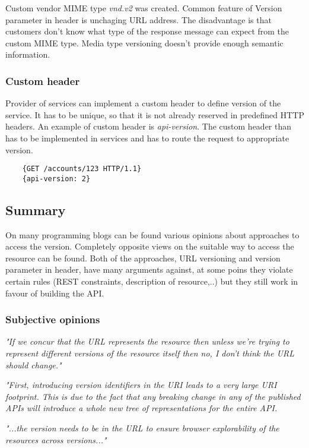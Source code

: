 Custom vendor MIME type \emph{vnd.v2} was created. Common feature of Version parameter in header is unchaging URL address. The disadvantage is that customers don't know what type of the response message can expect from the custom MIME type. Media type versioning doesn't provide enough semantic information.


\subsubsection{Custom header}
Provider of services can implement a custom header to define version of the service. It has to be unique, so that it is not already reserved in predefined HTTP headers. An example of custom header is \emph{api-version}. The custom header than has to be implemented in services and has to route the request to appropriate version.

\begin{lstlisting}
    {GET /accounts/123 HTTP/1.1}
    {api-version: 2}
\end{lstlisting}


\subsection{Summary}
On many programming blogs can be found various opinions about approaches to access the version. Completely opposite views on the suitable way to access the resource can be found. Both of the approaches, URL versioning and version parameter in header, have many arguments against, at some poins they violate certain rules (REST constraints, description of resource,..) but they still work in favour of building the API.

\subsubsection{Subjective opinions}
\emph{"If we concur that the URL represents the resource then unless we’re trying to represent different versions of the resource itself then no, I don’t think the URL should change."\cite{website:wrong-ways}}
\bigskip

\emph{"First, introducing version identifiers in the URI leads to a very large URI footprint. This is due to the fact that any breaking change in any of the published APIs will introduce a whole new tree of representations for the entire API.\cite{website:versioning-rest-api}}
\bigskip

\emph{"...the version needs to be in the URL to ensure browser explorability of the resources across versions..."\cite{website:best-practices-rest}}
\bigskip


